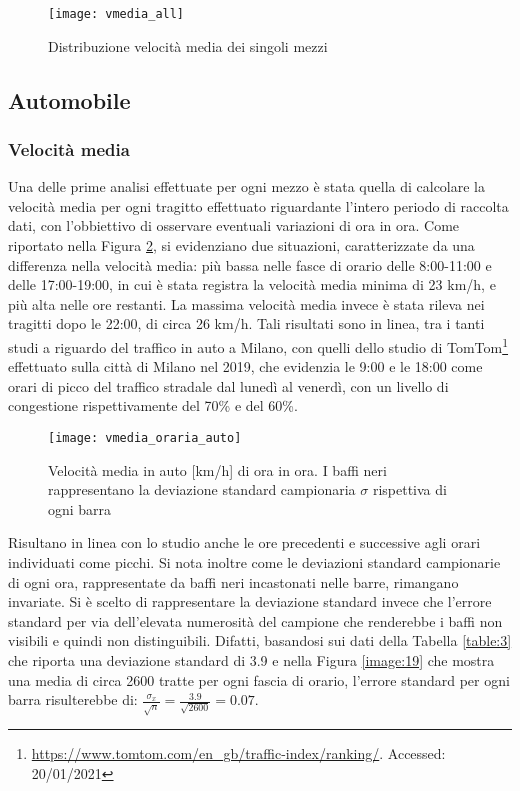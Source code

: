 \begin{figure}
\centering
\texttt{[image: vmedia\_all]}
\caption{Distribuzione velocità media dei singoli mezzi}
\label{image:26}
\end{figure}

\pagebreak

\subsection{Automobile}

\subsubsection{Velocità media}

Una delle prime analisi effettuate per ogni mezzo è stata quella di calcolare la velocità media per ogni tragitto effettuato riguardante l'intero periodo di raccolta dati, con l'obbiettivo di osservare eventuali variazioni di ora in ora. Come riportato nella Figura \ref{image:3}, si evidenziano due situazioni, caratterizzate da una differenza nella velocità media: più bassa nelle fasce di orario delle 8:00-11:00 e delle 17:00-19:00, in cui è stata registra la velocità media minima di 23 km/h, e più alta nelle ore restanti. La massima velocità media invece è stata rileva nei tragitti dopo le 22:00, di circa 26 km/h. Tali risultati sono in linea, tra i tanti studi a riguardo del traffico in auto a Milano, con quelli dello studio di TomTom\footnote{\url{https://www.tomtom.com/en_gb/traffic-index/ranking/}. Accessed: 20/01/2021} effettuato sulla città di Milano nel 2019, che evidenzia le 9:00 e le 18:00 come orari di picco del traffico stradale dal lunedì al venerdì, con un livello di congestione rispettivamente del 70\% e del 60\%.

\begin{figure}[H]
	\centering
	\texttt{[image: vmedia\_oraria\_auto]}
	\caption{Velocità media in auto [km/h] di ora in ora. I baffi neri rappresentano la deviazione standard campionaria $\sigma$ rispettiva di ogni barra}
	\label{image:3}
\end{figure}

Risultano in linea con lo studio anche le ore precedenti e successive agli orari individuati come picchi. Si nota inoltre come le deviazioni standard campionarie di ogni ora, rappresentate da baffi neri incastonati nelle barre, rimangano invariate. Si è scelto di rappresentare la deviazione standard invece che l'errore standard per via dell'elevata numerosità del campione che renderebbe i baffi non visibili e quindi non distinguibili. Difatti, basandosi sui dati della Tabella \ref{table:3} che riporta una deviazione standard di 3.9 e nella Figura \ref{image:19} che mostra una media di circa 2600 tratte per ogni fascia di orario, l'errore standard per ogni barra risulterebbe di: $\frac{\sigma_x}{\sqrt{n}} = \frac{3.9}{\sqrt{2600}} = 0.07$.



